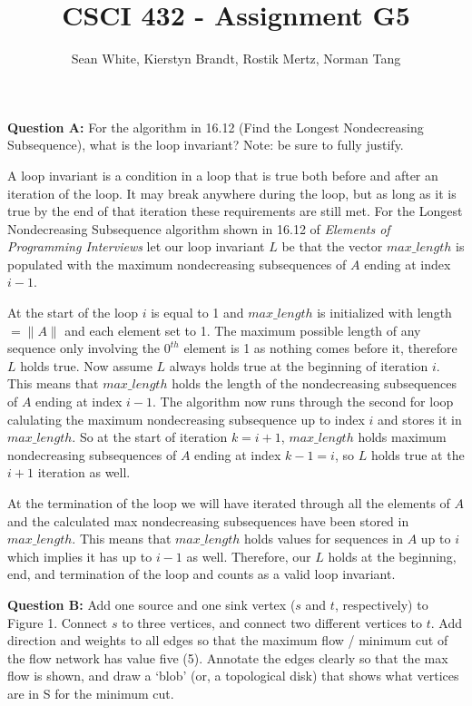 \documentclass[12pt]{article}
\author{Sean White, Kierstyn Brandt, Rostik Mertz, Norman Tang}
\title{CSCI 432 - Assignment G5}
\begin{document}
\maketitle

\noindent
\textbf{Question A:} For the algorithm in 16.12 (Find the Longest Nondecreasing Subsequence), what is the loop invariant? Note: be sure to fully justify. \smallskip

A loop invariant is a condition in a loop that is true both before and after an iteration of the loop. It may break anywhere during the loop, but as long as it is true by the end of that iteration these requirements are still met. For the Longest Nondecreasing Subsequence algorithm shown in 16.12 of \textit{Elements of Programming Interviews} let our loop invariant $L$ be that the vector $max\_length$ is populated with the maximum nondecreasing subsequences of $A$ ending at index $i - 1$. 

At the start of the loop $i$ is equal to 1 and $max\_length$ is initialized with length $= \|A\|$ and each element set to 1. The maximum possible length of any sequence only involving the $0^{th}$ element is 1 as nothing comes before it, therefore $L$ holds true. Now assume $L$ always holds true at the beginning of iteration $i$. This means that $max\_length$ holds the length of the nondecreasing subsequences of $A$ ending at index $i - 1$. The algorithm now runs through the second for loop calulating the maximum nondecreasing subsequence up to index $i$ and stores it in $max\_length$. So at the start of iteration $k = i + 1$, $max\_length$ holds maximum nondecreasing subsequences of $A$ ending at index $k - 1 = i$, so $L$ holds true at the $i + 1$ iteration as well.

At the termination of the loop we will have iterated through all the elements of $A$ and the calculated max nondecreasing subsequences have been stored in $max\_length$. This means that $max\_length$ holds values for sequences in $A$ up to $i$ which implies it has up to $i-1$ as well. Therefore, our $L$ holds at the beginning, end, and termination of the loop and counts as a valid loop invariant.


\pagebreak
\noindent
\textbf{Question B:} Add one source and one sink vertex ($s$ and $t$, respectively) to Figure 1. Connect $s$ to three vertices, and connect two different vertices to $t$. Add direction and weights to all edges so that the maximum flow / minimum cut of the flow network has value five (5). Annotate the edges clearly so that the max flow is shown, and draw a ‘blob’ (or, a topological disk) that shows what vertices are in S for the minimum cut. \smallskip
\end{document}
